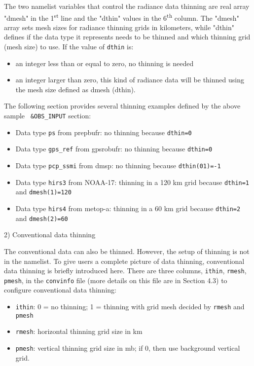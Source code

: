 The two namelist variables that control the radiance data thinning are real array "dmesh" in the 1\textsuperscript{st} line and the "dthin" values in the 6\textsuperscript{th} column. The "dmesh" array sets mesh sizes for radiance thinning grids in kilometers, while "dthin" defines if the data type it represents needs to be thinned and which thinning grid (mesh size) to use. If the value of \verb|dthin| is:

\begin{itemize}
\item an integer less than or equal to zero, no thinning is needed
\item an integer larger than zero, this kind of radiance data will be thinned using the mesh size defined as dmesh (dthin). 
\end{itemize}

The following section provides several thinning examples defined by the above sample \verb| &OBS_INPUT| section:
\begin{itemize}
\item Data type \verb|ps| from prepbufr: no thinning because \verb|dthin=0|
\item Data type \verb|gps_ref| from gpsrobufr: no thinning because \verb|dthin=0|
\item Data type \verb|pcp_ssmi| from dmsp: no thinning because \verb|dthin(01)=-1|
\item Data type \verb|hirs3| from NOAA-17: thinning in a 120 km grid because \verb|dthin=1| and \verb|dmesh(1)=120|
\item Data type \verb|hirs4| from metop-a: thinning in a 60 km grid because \verb|dthin=2| and \verb|dmesh(2)=60|
\end{itemize}

2) Conventional data thinning

The conventional data can also be thinned. However, the setup of thinning is not in the namelist. To give users a complete picture of data thinning, conventional data thinning is briefly introduced here. There are three columns, \verb|ithin|, \verb|rmesh|, \verb|pmesh|, in the \verb|convinfo| file (more details on this file are in Section 4.3) to configure conventional data thinning:

\begin{itemize}
\item \verb|ithin|: 0 = no thinning; 
             1 = thinning with grid mesh decided by \verb|rmesh| and \verb|pmesh|
\item \verb|rmesh|: horizontal thinning grid size in km
\item \verb|pmesh|: vertical thinning grid size in mb; if 0, then use background vertical grid.
\end{itemize}

